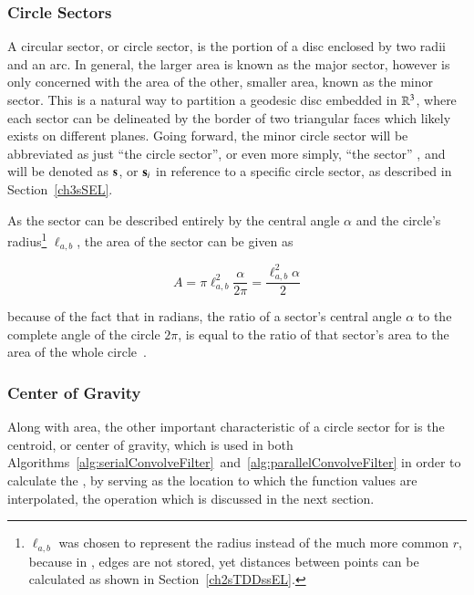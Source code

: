 %
%
\subsubsection{Circle Sectors}
\label{ch2sETBssGsssCS}
A circular sector, or circle sector, is the portion of a disc enclosed by two radii and an arc. In general, the larger area is known as the major sector, however  is only concerned with the area of the other, smaller area, known as the minor sector. This is a natural way to partition a geodesic disc embedded in $\mathbb{R}^{3}$, where each sector can be delineated by the border of two triangular faces which likely exists on different planes. Going forward, the minor circle sector will be abbreviated as just ``the circle sector'', or even more simply, ``the \gls{sector}''
, and will be denoted as $\mathbf{s}$, or $\mathbf{s}_i$ in reference to a specific circle sector, as described in Section~\ref{ch3sSEL}.%
%
%

As the sector can be described entirely by the central angle $\alpha$ and the circle's radius\footnote{$\ell_{a,b}$ was chosen to represent the radius instead of the much more common $r$, because in \tdd{}, edges are not stored, yet distances between points can be calculated as shown in Section~\ref{ch2sTDDssEL}.} $\ell_{a,b}$, the area of the sector can be given as

\begin{equation}
	A = \pi \ell_{a,b}^2\frac{\alpha}{2\pi} = \frac{\ell_{a,b}^2\alpha}{2}
	\label{eq:areaOfCircleSector}
\end{equation}

because of the fact that in radians, the ratio of a sector's central angle $\alpha$ to the complete angle of the circle $2\pi$, is equal to the ratio of that sector's area to the area of the whole circle~\cite{Weisstein19d}.%
%

%
%
\subsubsection{Center of Gravity}
\label{ch2sEBTssGsssCG}
Along with area, the other important characteristic of a circle sector for  is the centroid, or center of gravity, which is used in both Algorithms~\ref{alg:serialConvolveFilter}~and~\ref{alg:parallelConvolveFilter} in order to calculate the , by serving as the location to which the function values are interpolated, the operation which is discussed in the next section.

